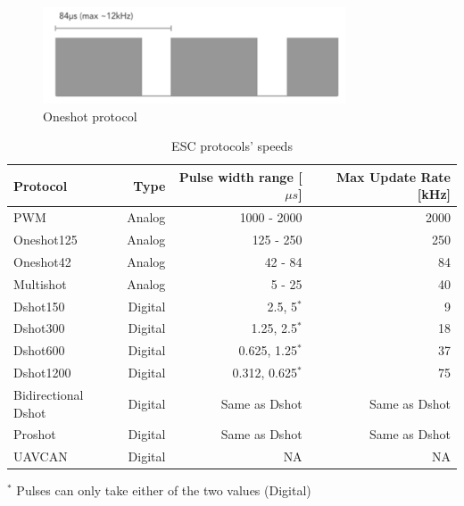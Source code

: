 \begin{figure}
    \centering
    \includegraphics[width=0.8\textwidth]{images/oneshot_sketch.png}
    \caption{Oneshot protocol \cite{BackyardRobotics2018}}
    \label{fig:oneshot}
\end{figure}

\begin{table}
\begin{center}
 \caption{ESC protocols' speeds}\vspace{1ex}
 \label{tab:tab_escs}
 \begin{tabular}{l|rrr}
 \hline
Protocol & Type & Pulse width range [$\mu s$]  & Max Update Rate [kHz] \\ \hline \hline
PWM                 & Analog & 1000 - 2000      & 2000\\
Oneshot125          & Analog & 125 - 250        & 250\\
Oneshot42           & Analog & 42 - 84          & 84\\
Multishot           & Analog & 5 - 25           & 40\\
Dshot150            & Digital & 2.5, 5$^*$          & 9\\
Dshot300            & Digital & 1.25, 2.5$^*$       & 18\\
Dshot600            & Digital & 0.625, 1.25$^*$     & 37\\
Dshot1200           & Digital & 0.312, 0.625$^*$    & 75\\
Bidirectional Dshot & Digital & Same as Dshot   & Same as Dshot \\
Proshot             & Digital & Same as Dshot   & Same as Dshot\\
UAVCAN              & Digital & NA              & NA\\
 \end{tabular}
\end{center}
\footnotesize{$^*$ Pulses can only take either of the two values (Digital)}
\end{table}



